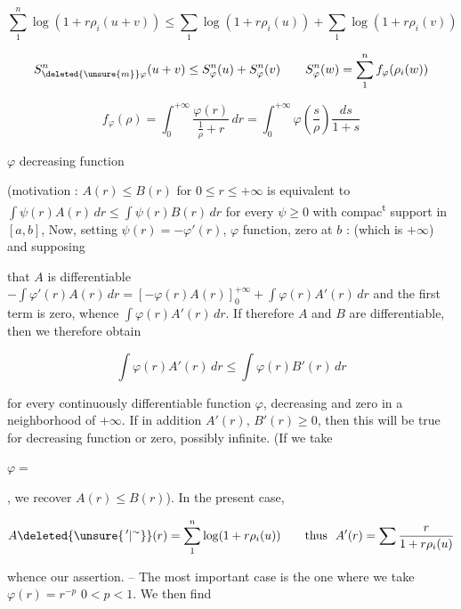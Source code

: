 \[
\sum_1^n\log(1+r\rho_i(u+v))\leq\sum_1\log(1+r\rho_i(u))+\sum_1\log(1+r\rho_i(v))
\]

\[
S_{\deleted{\unsure{m}}\varphi}^{n}(u+v)\leq S_\varphi^n(u)+S_\varphi^n(v)\qquad S_\varphi^n(w)=\sum_1^n f_\varphi(\rho_i(w))
\]

\[
f_\varphi(\rho)=\int_0^{+\infty}\frac{\varphi(r)}{\frac1\rho+r}\,dr=\int_0^{+\infty}\varphi\left(\frac s\rho\right)\frac{ds}{1+s}
\]

$\varphi$ decreasing function

(motivation :  $A(r)\leq B(r)$ for $0\leq r\leq+\infty$ is equivalent to $\int\psi(r)A(r)\,dr\leq\int\psi(r)B(r)\,dr$ for every $\psi\geq0$ with compac\textsuperscript{t} support in $[a,b]$, Now, setting $\psi(r)=-\varphi'(r)$, $\varphi$   function, zero at $b$ :    (which is $+\infty$) and supposing 

that $A$ is differentiable $-\int\varphi'(r)A(r)\,dr=[-\varphi(r)A(r)]_0^{+\infty}+\int\varphi(r)A'(r)\,dr$ and the first term is zero, whence $\int\varphi(r)A'(r)\,dr$. If therefore $A$ and $B$ are differentiable, then we therefore obtain

\[
\int\varphi(r)A'(r)\,dr\leq\int\varphi(r)B'(r)\,dr
\]

for every continuously differentiable function $\varphi$, decreasing \inserted{on $[0,+\infty[$} and zero in a neighborhood of $+\infty$. If in addition $A'(r)$, $B'(r)\geq0$, then this will be true for   decreasing function or zero, possibly infinite. (If we take

$\varphi=$


, we recover $A(r)\leq B(r)$). In the present case,

\[
A\deleted{\unsure{^{\,\prime}|{}^{\sim}}}(r)=\sum_1^n\log(1+r\rho_i(u))\qquad \text{thus }\ A'(r)=\sum\frac{r}{1+r\rho_i(u)}
\]

whence our assertion. -- The most important case is the one where we take $\varphi(r)=r^{-p}$ $0<p<1$. We then find

